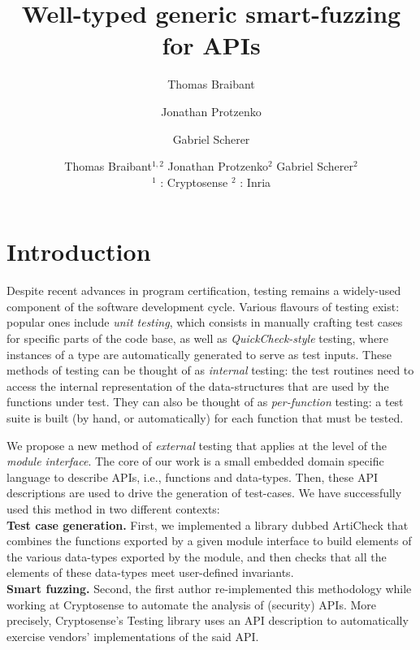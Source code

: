 \documentclass[twocolumn,9pt,a4paper]{easychair}
\newcommand{\acheck}{ArtiCheck\xspace}
\begin{document}
\date{}

\author{
Thomas Braibant
\and
Jonathan Protzenko
\and
Gabriel Scherer\\
}
\title{\vspace{-2cm}Well-typed generic smart-fuzzing for APIs}
\author{Thomas Braibant$^{1,2}$
  \quad Jonathan Protzenko$^{2}$
  \quad Gabriel Scherer$^{2}$ \\
  ${}^1$ : Cryptosense \quad ${}^2$ : Inria
}

\maketitle


\section{Introduction}
Despite recent advances in program certification, testing remains a
widely-used component of the software development cycle. Various
flavours of testing exist: popular ones include \emph{unit testing},
which consists in manually crafting test cases for specific parts of
the code base, as well as \emph{QuickCheck-style} testing, where
instances of a type are automatically generated to serve as test
inputs.
%
These methods of testing can be thought of as \emph{internal} testing:
the test routines need to access the internal representation of the
data-structures that are used by the functions under test. They can
also be thought of as \emph{per-function} testing: a test suite is
built (by hand, or automatically) for each function that must be
tested.

We propose a new method of \emph{external} testing that applies at the
level of the \emph{module interface}. The core of our work is a small
embedded domain specific language to describe APIs, i.e., functions
and data-types. Then, these API descriptions are used to drive the
generation of test-cases.
%
We have successfully used this method in two different contexts:
%
\\
\textbf{Test case generation.} First, we implemented a library dubbed
\acheck that combines the functions exported by a given module
interface to build elements of the various data-types exported by the
module, and then checks that all the elements of these data-types meet
user-defined invariants.
\\
\textbf{Smart fuzzing.} Second, the first author re-implemented this
methodology while working at Cryptosense to automate the analysis of
(security) APIs. More precisely, Cryptosense's Testing library uses an
API description to automatically exercise vendors' implementations of
the said API.
\end{document}
